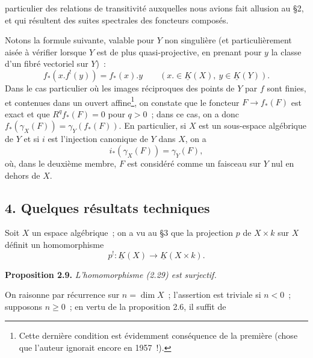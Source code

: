 particulier des relations de transitivité auxquelles nous avions fait allusion au \S 2, et qui résultent des suites spectrales des foncteurs composés.

Notons la formule suivante, valable pour $Y$ non singulière (et particulièrement aisée à vérifier lorsque $Y$ est de plus quasi-projective, en prenant pour $y$ la classe d'un fibré vectoriel sur $Y$)~:
\begin{equation}\tag{2.27}
 f_*(x.f^!(y))=f_*(x).y\qquad(x.\in\underline K(X),\ y\in\underline K(Y)).
\end{equation}
Dans le cas particulier où les images réciproques des points de $Y$ par $f$ sont finies, et contenues dans un ouvert affine\footnote{Cette dernière condition est évidemment conséquence de la première (chose que l'auteur ignorait encore en 1957~!).}, on constate que le foncteur $F\longrightarrow f_*(F)$ est exact et que $R^qf_*(F)=0$ pour $q>0$~; dans ce cas, on a donc $f_*(\gamma_X(F))=\gamma_Y(f_*(F))$. En particulier, si $X$ est un sous-espace algébrique de $Y$ et si $i$ est l'injection canonique de $Y$ dans $X$, on a
\begin{equation}\tag{2.28}
 i_*(\gamma_X(F))=\gamma_Y(F),
\end{equation}
où, dans le deuxième membre, $F$ est considéré comme un faisceau sur $Y$ nul en dehors de $X$.

\subsection*{4. Quelques résultats techniques}

Soit $X$ un espace algébrique~; on a vu au \S 3 que la projection $p$ de $X\times k$ sur $X$ définit un homomorphisme
\begin{equation}\tag{2.29}
 p^!:\underline K(X)\longrightarrow\underline K(X\times k).
\end{equation}

\textbf{Proposition 2.9.} \emph{L'homomorphisme (2.29) est surjectif.}

On raisonne par récurrence sur $n=\dim X$~; l'assertion est triviale si $n<0$~; supposons $n\geq0$~; en vertu de la proposition 2.6, il suffit de
